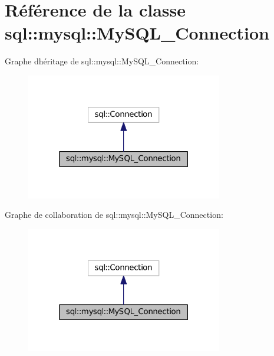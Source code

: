 \hypertarget{classsql_1_1mysql_1_1MySQL__Connection}{}\section{Référence de la classe sql\+:\+:mysql\+:\+:My\+S\+Q\+L\+\_\+\+Connection}
\label{classsql_1_1mysql_1_1MySQL__Connection}


Graphe d\textquotesingle{}héritage de sql\+:\+:mysql\+:\+:My\+S\+Q\+L\+\_\+\+Connection\+:\nopagebreak
\begin{figure}[H]
\begin{center}
\leavevmode
\includegraphics[width=243pt]{classsql_1_1mysql_1_1MySQL__Connection__inherit__graph}
\end{center}
\end{figure}


Graphe de collaboration de sql\+:\+:mysql\+:\+:My\+S\+Q\+L\+\_\+\+Connection\+:\nopagebreak
\begin{figure}[H]
\begin{center}
\leavevmode
\includegraphics[width=243pt]{classsql_1_1mysql_1_1MySQL__Connection__coll__graph}
\end{center}
\end{figure}
